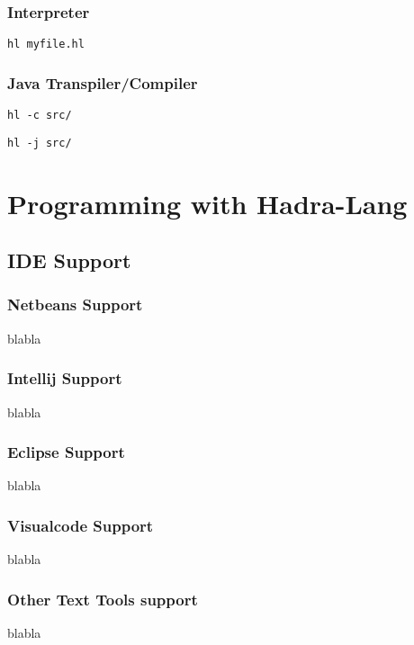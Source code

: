 \documentclass{tufte-book}
\begin{document}
            \section{Interpreter}
            \begin{lstlisting}
hl myfile.hl
            \end{lstlisting}

            \section{Java Transpiler/Compiler}

            \begin{lstlisting}
hl -c src/
            \end{lstlisting}

            \begin{lstlisting}
hl -j src/
            \end{lstlisting}

    \part{Programming with Hadra-Lang}
        \chapter{IDE Support}
        \section{Netbeans Support}
        blabla
        \section{Intellij Support}
        blabla
        \section{Eclipse Support}
        blabla
        
        \section{Visualcode Support}
        blabla
        \section{Other Text Tools support}
        blabla
\end{document}
